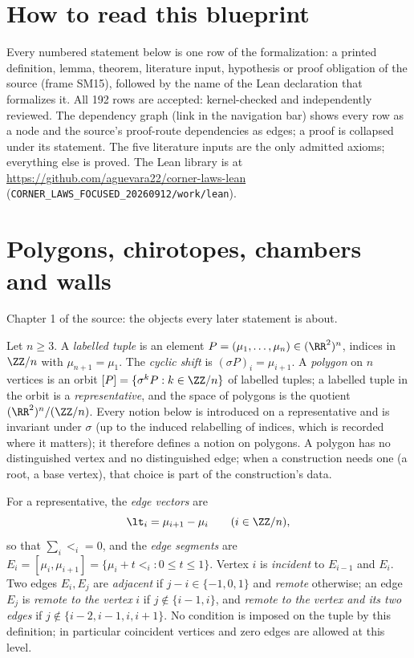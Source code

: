 \chapter*{How to read this blueprint}
Every numbered statement below is one row of the formalization: a printed definition, lemma, theorem, literature input,
hypothesis or proof obligation of the source (frame SM15), followed by the name of the Lean declaration that formalizes it.
All 192 rows are accepted: kernel-checked and independently reviewed. The dependency graph (link in the navigation bar)
shows every row as a node and the source's proof-route dependencies as edges; a proof is collapsed under its statement.
The five literature inputs are the only admitted axioms; everything else is proved. The Lean library is at
\url{https://github.com/aguevara22/corner-laws-lean} (\texttt{CORNER\_LAWS\_FOCUSED\_20260912/work/lean}).

\chapter{Polygons, chirotopes, chambers and walls}
Chapter 1 of the source: the objects every later statement is about.

\begin{definition}\label{def:polygon}\leanok
Let $n\geq3$. A \emph{labelled tuple} is an element
$P=(\mu_1,\ldots,\mu_n)\in(\RR^2)^n$, indices in $\ZZ/n$ with $\mu_{n+1}=\mu_1$. The
\emph{cyclic shift} is $(\sigma P)_i=\mu_{i+1}$. A \emph{polygon} on $n$
vertices is an orbit $[P]=\{\sigma^kP:k\in\ZZ/n\}$ of labelled tuples; a
labelled tuple in the orbit is a \emph{representative}, and the space of
polygons is the quotient $(\RR^2)^n/(\ZZ/n)$. Every notion below is
introduced on a representative and is invariant under $\sigma$ (up to the
induced relabelling of indices, which is recorded where it matters); it
therefore defines a notion on polygons. A polygon has no distinguished vertex
and no distinguished edge; when a construction needs one (a root, a base
vertex), that choice is part of the construction's data.

For a representative, the \emph{edge vectors} are
\[
\lt_i=\mu_{i+1}-\mu_i\qquad(i\in\ZZ/n),
\]
so that $\sum_i\lt_i=0$, and the \emph{edge segments} are
$E_i=[\mu_i,\mu_{i+1}]=\{\mu_i+t\lt_i:0\leq t\leq1\}$. Vertex $i$ is
\emph{incident} to $E_{i-1}$ and $E_i$. Two edges $E_i,E_j$ are
\emph{adjacent} if $j-i\in\{-1,0,1\}$ and \emph{remote} otherwise; an edge
$E_j$ is \emph{remote to the vertex} $i$ if $j\notin\{i-1,i\}$, and
\emph{remote to the vertex and its two edges} if $j\notin\{i-2,i-1,i,i+1\}$.
No condition is imposed on the tuple by this definition; in particular
coincident vertices and zero edges are allowed at this level.
\end{definition}

